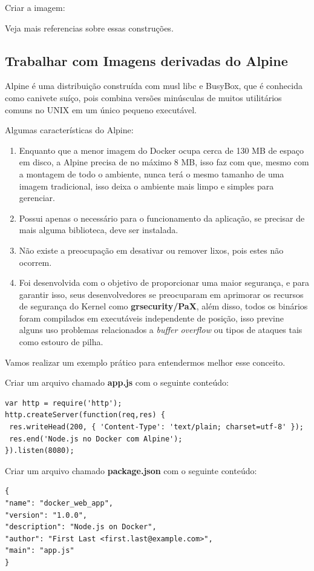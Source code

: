 \documentclass[a4paper,11pt]{article}
\begin{document}
Criar a imagem: \\

Veja mais referencias sobre essas construções\cite{constimagem}.

\subsection{Trabalhar com Imagens derivadas do Alpine}
Alpine é uma distribuição construída com musl libc e BusyBox, que é conhecida como canivete suíço, pois combina versões minúsculas de muitos utilitários comuns no UNIX em um único pequeno executável.

Algumas características do Alpine: \vspace{-1em}
\begin{enumerate}
  \item Enquanto que a menor imagem do Docker ocupa cerca de 130 MB de espaço em disco, a Alpine precisa de no máximo 8 MB, isso faz com que, mesmo com a montagem de todo o ambiente, nunca terá o mesmo tamanho de uma imagem tradicional, isso deixa o ambiente mais limpo e simples para gerenciar.
  \item Possui apenas o necessário para o funcionamento da aplicação, se precisar de mais alguma biblioteca, deve ser instalada.
  \item Não existe a preocupação em desativar ou remover lixos, pois estes não ocorrem.
  \item Foi desenvolvida com o objetivo de proporcionar uma maior segurança, e para garantir isso, seus desenvolvedores se preocuparam em aprimorar os recursos de segurança do Kernel como \textbf{grsecurity/PaX}, além disso, todos os binários foram compilados em executáveis independente de posição, isso previne alguns uso problemas relacionados a \textit{buffer overflow} ou tipos de ataques tais como estouro de pilha.
\end{enumerate}

Vamos realizar um exemplo prático para entendermos melhor esse conceito.

Criar um arquivo chamado \textbf{app.js} com o seguinte conteúdo:
\begin{lstlisting}
var http = require('http');
http.createServer(function(req,res) {
 res.writeHead(200, { 'Content-Type': 'text/plain; charset=utf-8' });
 res.end('Node.js no Docker com Alpine');
}).listen(8080);
\end{lstlisting}

Criar um arquivo chamado \textbf{package.json} com o seguinte conteúdo:
\begin{lstlisting}
{
"name": "docker_web_app",
"version": "1.0.0",
"description": "Node.js on Docker",
"author": "First Last <first.last@example.com>",
"main": "app.js"
}
\end{lstlisting}
\end{document}
